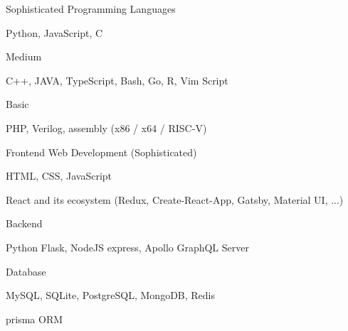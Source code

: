 

\begin{cventries}

  \cventry
    {Sophisticated}
    {Programming Languages}
    {}
    {}
    {
      \begin{cvitems}
        \item {Python, JavaScript, C}
      \end{cvitems}
    }

  \cventry
    {Medium}
    {}
    {}
    {}
    {
      \begin{cvitems}
        \item {C++, JAVA, TypeScript, Bash, Go, R, Vim Script}
      \end{cvitems}
    }

  \cventry
    {Basic}
    {}
    {}
    {}
    {
      \begin{cvitems}
        \item {PHP, Verilog, assembly (x86 / x64 / RISC-V)}
      \end{cvitems}
    }
    
  \cventry
    {Frontend}
    {Web Development (Sophisticated)}
    {}
    {}
    {
      \begin{cvitems}
        \item {HTML, CSS, JavaScript}
        \item {React and its ecosystem (Redux, Create-React-App, Gatsby, Material UI, ...)}
      \end{cvitems}
    }

  \cventry
    {Backend}
    {}
    {}
    {}
    {
      \begin{cvitems}
        \item {Python Flask, NodeJS express, Apollo GraphQL Server}
      \end{cvitems}
    }
    
  \cventry
    {Database}
    {}
    {}
    {}
    {
      \begin{cvitems}
        \item {MySQL, SQLite, PostgreSQL, MongoDB, Redis}
        \item {prisma ORM}
      \end{cvitems}
    }
   

\end{cventries}
